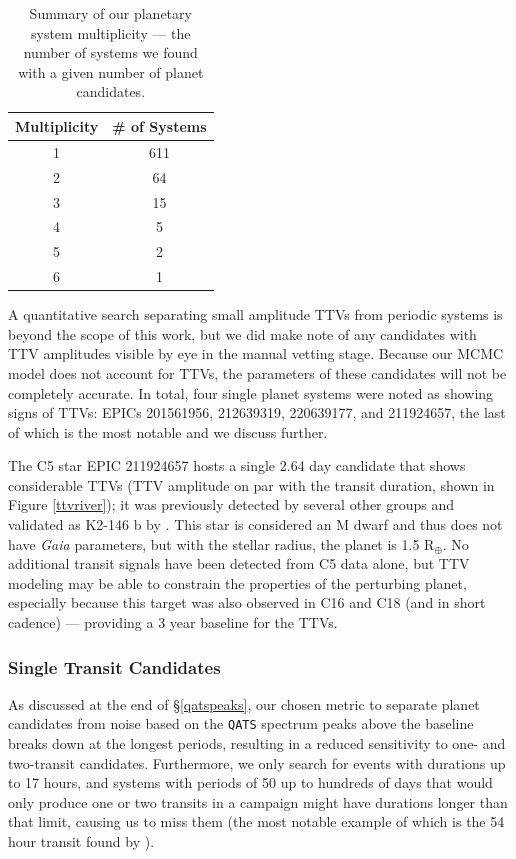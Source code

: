 \documentclass[twocolumn]{aastex62}
\newcommand{\project}[1]{\textsl{#1}}
\newcommand{\pipeline}[1]{\texttt{#1}}
\begin{document}
\begin{table}[tbp]
\caption{Summary of our planetary system multiplicity --- the number
  of systems we found with a given number of planet
  candidates. \label{tab:multis}} \centering
\begin{tabular}{| c | c |}
\hline
Multiplicity & \# of Systems \\
\hline
1 & 611 \\ 
2 & 64 \\ 
3 & 15 \\ 
4 & 5 \\ 
5 & 2 \\ 
6 & 1 \\ 
\hline 
\end{tabular}
\end{table}

A quantitative search separating small amplitude TTVs from periodic
systems is beyond the scope of this work, but we did make note of any
candidates with TTV amplitudes visible by eye in the manual vetting
stage. Because our MCMC model does not account for TTVs, the
parameters of these candidates will not be completely accurate. In
total, four single planet systems were noted as showing signs of TTVs:
EPICs 201561956, 212639319, 220639177, and 211924657, the last of
which is the most notable and we discuss further.

The C5 star EPIC 211924657 hosts a single 2.64 day candidate that
shows considerable TTVs (TTV amplitude on par with the transit
duration, shown in Figure \ref{ttvriver}); it was previously detected
by several other groups and validated as K2-146 b by
\cite{hir18}. This star is considered an M dwarf and thus does not
have \project{Gaia} parameters, but with the \cite{hub16} stellar
radius, the planet is 1.5 R$_\oplus$.  No additional transit signals
have been detected from C5 data alone, but TTV modeling may be able to
constrain the properties of the perturbing planet, especially because
this target was also observed in C16 and C18 (and in short cadence)
--- providing a 3 year baseline for the TTVs.


\subsubsection{Single Transit Candidates}
\label{sec:singletran}

As discussed at the end of \S\ref{qatspeaks}, our chosen metric to
separate planet candidates from noise based on the \pipeline{QATS}
spectrum peaks above the baseline breaks down at the longest periods,
resulting in a reduced sensitivity to one- and two-transit
candidates. Furthermore, we only search for events with durations up
to 17 hours, and systems with periods of 50 up to hundreds of days
that would only produce one or two transits in a campaign might have
durations longer than that limit, causing us to miss them (the most
notable example of which is the 54 hour transit found by
\cite{gil18}).
\end{document}
